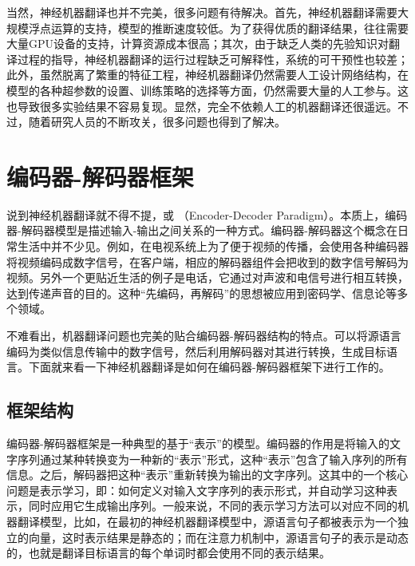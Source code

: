 \parinterval  当然，神经机器翻译也并不完美，很多问题有待解决。首先，神经机器翻译需要大规模浮点运算的支持，模型的推断速度较低。为了获得优质的翻译结果，往往需要大量GPU设备的支持，计算资源成本很高；其次，由于缺乏人类的先验知识对翻译过程的指导，神经机器翻译的运行过程缺乏可解释性，系统的可干预性也较差；此外，虽然脱离了繁重的特征工程，神经机器翻译仍然需要人工设计网络结构，在模型的各种超参数的设置、训练策略的选择等方面，仍然需要大量的人工参与。这也导致很多实验结果不容易复现。显然，完全不依赖人工的机器翻译还很遥远。不过，随着研究人员的不断攻关，很多问题也得到了解决。

\sectionnewpage
\section{编码器-解码器框架}

\parinterval 说到神经机器翻译就不得不提{\small{}}，或{\small{}} （Encoder-Decoder Paradigm）。本质上，编码器-解码器模型是描述输入-输出之间关系的一种方式。编码器-解码器这个概念在日常生活中并不少见。例如，在电视系统上为了便于视频的传播，会使用各种编码器将视频编码成数字信号，在客户端，相应的解码器组件会把收到的数字信号解码为视频。另外一个更贴近生活的例子是电话，它通过对声波和电信号进行相互转换，达到传递声音的目的。这种“先编码，再解码”的思想被应用到密码学、信息论等多个领域。

\parinterval 不难看出，机器翻译问题也完美的贴合编码器-解码器结构的特点。可以将源语言编码为类似信息传输中的数字信号，然后利用解码器对其进行转换，生成目标语言。下面就来看一下神经机器翻译是如何在编码器-解码器框架下进行工作的。

\subsection{框架结构}

\parinterval  编码器-解码器框架是一种典型的基于“表示”的模型。编码器的作用是将输入的文字序列通过某种转换变为一种新的“表示”形式，这种“表示”包含了输入序列的所有信息。之后，解码器把这种“表示”重新转换为输出的文字序列。这其中的一个核心问题是表示学习，即：如何定义对输入文字序列的表示形式，并自动学习这种表示，同时应用它生成输出序列。一般来说，不同的表示学习方法可以对应不同的机器翻译模型，比如，在最初的神经机器翻译模型中，源语言句子都被表示为一个独立的向量，这时表示结果是静态的；而在注意力机制中，源语言句子的表示是动态的，也就是翻译目标语言的每个单词时都会使用不同的表示结果。

